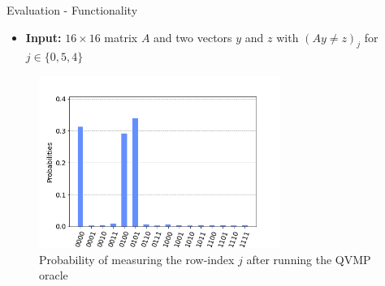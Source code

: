 \documentclass[10pt]{beamer}
\begin{document}
\begin{frame}{Evaluation - Functionality}
  \begin{itemize}
    \item \textbf{Input:} $16 \times 16$ matrix $A$ and two vectors $y$ and $z$
      with $(Ay \neq z)_j$ for $j \in \{0, 5, 4\}$
  \end{itemize}
  \begin{figure}
    \centering
    \includegraphics[width=0.7\textwidth]{assets/16x16-simulation.png}
    \caption{Probability of measuring the row-index $j$ after running the QVMP
    oracle}
    \label{fig:qvmp_oracle_sample_execution}
  \end{figure}
\end{frame}
\end{document}
